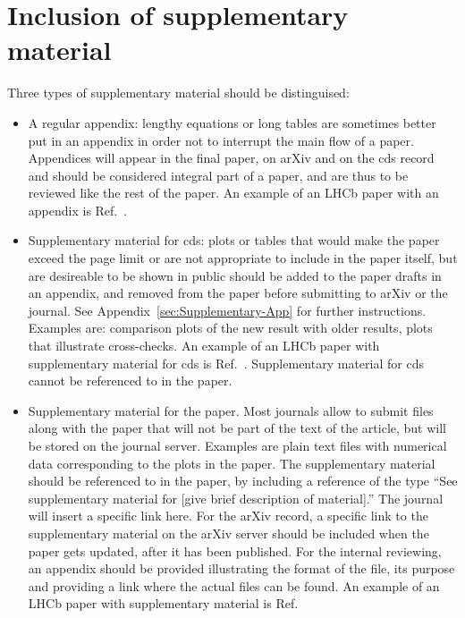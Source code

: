 \section{Inclusion of supplementary material}
\label{sec:Supplementary}

Three types of supplementary material should be distinguised:
\begin{itemize}
\item{A regular appendix: lengthy equations or long tables are sometimes
better put in an appendix in order not to interrupt the main flow of a paper.
Appendices will appear in the final paper, on arXiv
and on the cds record and should be considered integral
part of a paper, and are thus to be reviewed like the rest of the paper.
An example of an LHCb paper with an appendix is Ref.~\cite{LHCb-PAPER-2013-070}.
}
\item{Supplementary material for cds: plots or tables that 
would make the paper exceed the page limit or are
not appropriate to include in the paper itself,
but are desireable to be shown in public
should be added to the paper drafts in an appendix, and
removed from the paper before submitting to arXiv or the journal.
See Appendix~\ref{sec:Supplementary-App} for further instructions.
Examples are: comparison plots of the new result with older results,
plots that illustrate cross-checks.
An example of an LHCb paper with supplementary material for cds 
is Ref.~\cite{LHCb-PAPER-2013-035}.
Supplementary material for cds cannot be referenced to in the paper.
}
\item{Supplementary material for the paper. Most journals allow
to submit files along with the paper that will not be part of the
text of the article, but will be stored on the journal server.
Examples are plain text files with numerical data corresponding to the plots
in the paper. 
The supplementary material should be referenced to in the paper, by including a reference
of the type  ``See supplementary material for [give brief description of material].''
The journal will insert a specific link here. For the arXiv record, 
a specific link to the supplementary material on the arXiv server should be 
included when the paper gets updated, after it has been published.
For the internal reviewing, an appendix should be provided illustrating
the format of the file, its purpose and providing a link where the actual
files can be found.
An example of an LHCb paper with supplementary material is Ref.~\cite{LHCb-PAPER-2011-020}
}
\end{itemize}

